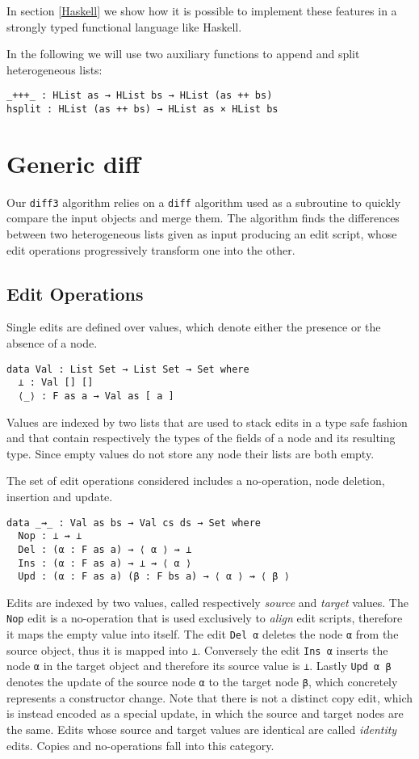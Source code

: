 \documentclass[preprint]{sigplanconf}
\begin{document}
	In section \ref{Haskell} we show how it is possible to implement these 
	features in a strongly typed functional language like Haskell.
	
	In the following we will use two auxiliary functions to append and split 
	heterogeneous lists:
\begin{verbatim}
_+++_ : HList as → HList bs → HList (as ++ bs)
hsplit : HList (as ++ bs) → HList as × HList bs
\end{verbatim}
	
\section{Generic diff}
	Our \texttt{diff3} algorithm relies on a \texttt{diff} algorithm used 
        as a subroutine to quickly compare the input objects and merge them.
	The algorithm finds the differences between two heterogeneous lists given 
	as input producing an edit script, whose edit operations progressively 
	transform one into the other.

	\subsection{Edit Operations}
	Single edits are defined over values, which denote either the presence or 
	the absence of a node.
\begin{verbatim}
data Val : List Set → List Set → Set where
  ⊥ : Val [] []
  ⟨_⟩ : F as a → Val as [ a ] 
\end{verbatim}
	Values are indexed by two lists that are used to stack edits in a type 
	safe fashion and that contain respectively the types of the fields of a node 
	and its resulting type.
	Since empty values do not store any node their lists are both empty.

	The set of edit operations considered includes a no-operation, node 
	deletion, insertion and update.
\begin{verbatim}
data _⇝_ : Val as bs → Val cs ds → Set where
  Nop : ⊥ ⇝ ⊥
  Del : (α : F as a) → ⟨ α ⟩ ⇝ ⊥
  Ins : (α : F as a) → ⊥ ⇝ ⟨ α ⟩
  Upd : (α : F as a) (β : F bs a) → ⟨ α ⟩ ⇝ ⟨ β ⟩
\end{verbatim}
	Edits are indexed by two values, called respectively 
	\emph{source} and \emph{target} values. The \texttt{Nop} edit is 
	a no-operation that is used exclusively to \emph{align} edit scripts,
	therefore it maps the empty value into itself.
	The edit \texttt{Del α} deletes the node \texttt{α} from the source object, 
	thus it is mapped into \texttt{⊥}. Conversely the edit \texttt{Ins α} 
	inserts the node \texttt{α} in the target object and therefore its source value 
	is 	\texttt{⊥}.
	Lastly \texttt{Upd α β} denotes the update of the source node \texttt{α}
	to the target node \texttt{β}, which concretely represents a 
	constructor change. 
	Note that there is not a distinct copy edit, which is instead encoded as a 
	special	update, in which the source and target nodes are the same.
	Edits whose source and target values are identical are 
	called \emph{identity} edits. Copies and no-operations fall into this
	category.
	
\end{document}
